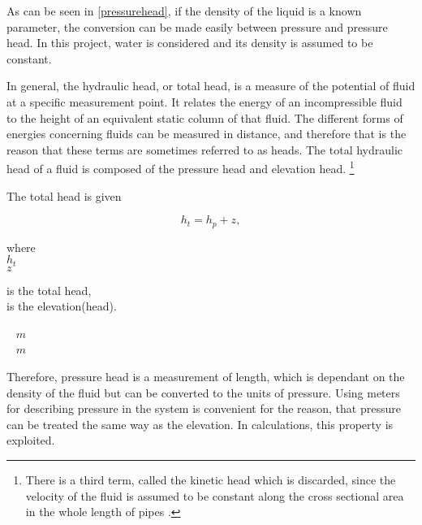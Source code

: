 As can be seen in \eqref{pressurehead}, if the density of the liquid is a known parameter, the conversion can be made easily between pressure and pressure head. In this project, water is considered and its density is assumed to be constant. 

In general, the hydraulic head, or total head, is a measure of the potential of fluid at a specific measurement point. It relates the energy of an incompressible fluid to the height of an equivalent static column of that fluid. The different forms of energies concerning fluids can be measured in distance, and therefore that is the reason that these terms are sometimes referred to as heads. The total hydraulic head of a fluid is composed of the pressure head and elevation head. \footnote{There is a third term, called the kinetic head which is discarded, since the velocity of the fluid is assumed to be constant along the cross sectional area in the whole length of pipes \cite{chen2016sustainable}.}

The total head is given 

\begin{equation}
\label{totalhead}
  h_t = h_p + z,
\end{equation}

\begin{minipage}[t]{0.20\textwidth}
where\\
\hspace*{8mm} $h_t$ \\
\hspace*{8mm} $z$ 
\end{minipage}
\begin{minipage}[t]{0.68\textwidth}
\vspace*{2mm}
is the total head,\\
is the elevation(head).
\end{minipage}
\begin{minipage}[t]{0.10\textwidth}
\vspace*{2mm}
\textcolor{White}{te}$\unit{m}$\\
\textcolor{White}{te}$\unit{m}$
\end{minipage}

Therefore, pressure head is a measurement of length, which is dependant on the density of the fluid but can be converted to the units of pressure. Using meters for describing pressure in the system is convenient for the reason, that pressure can be treated the same way as the elevation. In calculations, this property is exploited. 

